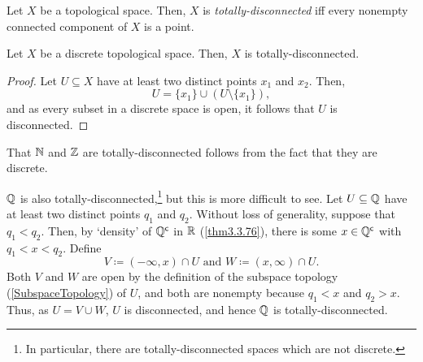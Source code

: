 \begin{dfn}
Let $X$ be a topological space.  Then, $X$ is \emph{totally-disconnected} iff every nonempty connected component of $X$ is a point.
\end{dfn}
\begin{prp}
Let $X$ be a discrete topological space.  Then, $X$ is totally-disconnected.
\begin{proof}
Let $U\subseteq X$ have at least two distinct points $x_1$ and $x_2$.  Then,
\begin{equation}
U=\{ x_1\} \cup (U\setminus \{ x_1\} ),
\end{equation}
and as every subset in a discrete space is open, it follows that $U$ is disconnected.
\end{proof}
\end{prp}
\begin{exm}
That $\mathbb{N}$ and $\mathbb{Z}$ are totally-disconnected follows from the fact that they are discrete.

$\mathbb{Q}$ is also totally-disconnected,\footnote{In particular, there are totally-disconnected spaces which are not discrete.} but this is more difficult to see.  Let $U\subseteq \mathbb{Q}$ have at least two distinct points $q_1$ and $q_2$.  Without loss of generality, suppose that $q_1<q_2$.  Then, by `density' of $\mathbb{Q} ^{\mathsf{c}}$ in $\mathbb{R}$ (\cref{thm3.3.76}), there is some $x\in \mathbb{Q} ^{\mathsf{c}}$ with $q_1<x<q_2$.  Define
\begin{equation}
V\coloneqq (-\infty ,x)\cap U \text{ and }W\coloneqq (x,\infty )\cap U .
\end{equation}
Both $V$ and $W$ are open by the definition of the subspace topology (\cref{SubspaceTopology}) of $U$, and both are nonempty because $q_1<x$ and $q_2>x$.  Thus, as $U=V\cup W$, $U$ is disconnected, and hence $\mathbb{Q}$ is totally-disconnected.
\end{exm}

